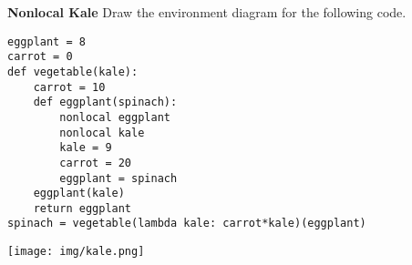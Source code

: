 \question \textbf{Nonlocal Kale} \newline
Draw the environment diagram for the following code.

\begin{lstlisting}
eggplant = 8
carrot = 0
def vegetable(kale):
    carrot = 10
    def eggplant(spinach):
        nonlocal eggplant
        nonlocal kale
        kale = 9
        carrot = 20
        eggplant = spinach
    eggplant(kale)
    return eggplant
spinach = vegetable(lambda kale: carrot*kale)(eggplant)
\end{lstlisting}

\begin{solution}[3in]
    \texttt{[image: img/kale.png]}
\end{solution}

